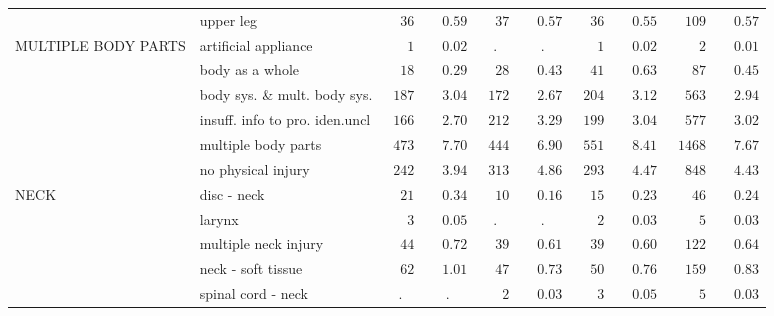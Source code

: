 \documentclass[9pt, oneside]{article}   	%
\begin{document}
\begin{longtable}{p{1.8in}p{2.2in}cccccccc}
 & upper leg  & $\phantom{00}36$ & $\phantom{00}0.59$ & $\phantom{00}37$ & $\phantom{00}0.57$ & $\phantom{00}36$ & $\phantom{00}0.55$ & $\phantom{00}109$ & $\phantom{00}0.57$ \\
MULTIPLE BODY PARTS & artificial appliance  & $\phantom{000}1$ & $\phantom{00}0.02$ & . & . & $\phantom{000}1$ & $\phantom{00}0.02$ & $\phantom{0000}2$ & $\phantom{00}0.01$ \\
 & body as a whole  & $\phantom{00}18$ & $\phantom{00}0.29$ & $\phantom{00}28$ & $\phantom{00}0.43$ & $\phantom{00}41$ & $\phantom{00}0.63$ & $\phantom{000}87$ & $\phantom{00}0.45$ \\
 & body sys. \& mult. body sys.  & $\phantom{0}187$ & $\phantom{00}3.04$ & $\phantom{0}172$ & $\phantom{00}2.67$ & $\phantom{0}204$ & $\phantom{00}3.12$ & $\phantom{00}563$ & $\phantom{00}2.94$ \\
 & insuff. info to pro. iden.uncl  & $\phantom{0}166$ & $\phantom{00}2.70$ & $\phantom{0}212$ & $\phantom{00}3.29$ & $\phantom{0}199$ & $\phantom{00}3.04$ & $\phantom{00}577$ & $\phantom{00}3.02$ \\
 & multiple body parts  & $\phantom{0}473$ & $\phantom{00}7.70$ & $\phantom{0}444$ & $\phantom{00}6.90$ & $\phantom{0}551$ & $\phantom{00}8.41$ & $\phantom{0}1468$ & $\phantom{00}7.67$ \\
 & no physical injury  & $\phantom{0}242$ & $\phantom{00}3.94$ & $\phantom{0}313$ & $\phantom{00}4.86$ & $\phantom{0}293$ & $\phantom{00}4.47$ & $\phantom{00}848$ & $\phantom{00}4.43$ \\
NECK & disc - neck  & $\phantom{00}21$ & $\phantom{00}0.34$ & $\phantom{00}10$ & $\phantom{00}0.16$ & $\phantom{00}15$ & $\phantom{00}0.23$ & $\phantom{000}46$ & $\phantom{00}0.24$ \\
 & larynx  & $\phantom{000}3$ & $\phantom{00}0.05$ & . & . & $\phantom{000}2$ & $\phantom{00}0.03$ & $\phantom{0000}5$ & $\phantom{00}0.03$ \\
 & multiple neck injury  & $\phantom{00}44$ & $\phantom{00}0.72$ & $\phantom{00}39$ & $\phantom{00}0.61$ & $\phantom{00}39$ & $\phantom{00}0.60$ & $\phantom{00}122$ & $\phantom{00}0.64$ \\
 & neck - soft tissue  & $\phantom{00}62$ & $\phantom{00}1.01$ & $\phantom{00}47$ & $\phantom{00}0.73$ & $\phantom{00}50$ & $\phantom{00}0.76$ & $\phantom{00}159$ & $\phantom{00}0.83$ \\
 & spinal cord - neck  & . & . & $\phantom{000}2$ & $\phantom{00}0.03$ & $\phantom{000}3$ & $\phantom{00}0.05$ & $\phantom{0000}5$ & $\phantom{00}0.03$ \\

\end{longtable}
\end{document}
